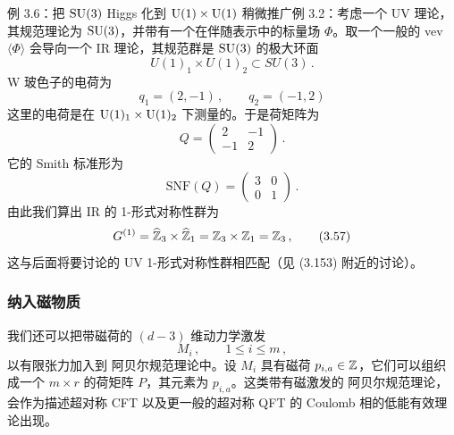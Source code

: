 \begin{examplebox}{例 3.6：把 $\mathrm{SU}(3)$ Higgs 化到 $\mathrm{U}(1)\times \mathrm{U}(1)$}
稍微推广例 3.2：考虑一个 UV 理论，其规范理论为 $\mathrm{SU}(3)$，并带有一个在伴随表示中的标量场 $\Phi$。取一个一般的 vev $\langle\Phi\rangle$ 会导向一个 IR 理论，其规范群是 $\mathrm{SU}(3)$ 的极大环面
\begin{equation}
  U(1)_1\times U(1)_2\subset SU(3)\,. \tag{3.53}
\end{equation}
W 玻色子的电荷为
\begin{equation}
  q_1=(2,-1)\,,\qquad q_2=(-1,2) \tag{3.54}
\end{equation}
这里的电荷是在 $\mathrm{U}(1)_1\times \mathrm{U}(1)_2$ 下测量的。于是荷矩阵为
\begin{equation}
  Q=\begin{pmatrix} 2 & -1\\ -1 & 2\end{pmatrix}\,. \tag{3.55}
\end{equation}
它的 Smith 标准形为
\begin{equation}
  \mathrm{SNF}(Q)=\begin{pmatrix} 3 & 0\\ 0 & 1\end{pmatrix}\,. \tag{3.56}
\end{equation}
由此我们算出 IR 的 1-形式对称性群为
\begin{equation}
  G^{(1)}=\widehat{\mathbb{Z}}_3\times\widehat{\mathbb{Z}}_1=\mathbb{Z}_3\times\mathbb{Z}_1=\mathbb{Z}_3\,, \tag{3.57}
\end{equation}
这与后面将要讨论的 UV 1-形式对称性群相匹配（见 (3.153) 附近的讨论）。
\end{examplebox}


\subsubsection{纳入磁物质}

我们还可以把带磁荷的 $(d-3)$ 维动力学激发
\begin{equation}
  M_i\,,\qquad 1\le i\le m\,, \tag{3.58}
\end{equation}
以有限张力加入到 阿贝尔规范理论中。设 $M_i$ 具有磁荷 $p_{i,a}\in\mathbb{Z}$，它们可以组织成一个 $m\times r$ 的荷矩阵 $P$，其元素为 $p_{i,a}$。这类带有磁激发的 阿贝尔规范理论，会作为描述超对称 CFT 以及更一般的超对称 QFT 的 Coulomb 相的低能有效理论出现。

